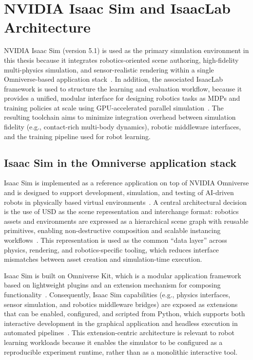 \section{NVIDIA Isaac Sim and IsaacLab Architecture}
\label{sec:isaac_sim_isaaclab_architecture}

NVIDIA Isaac Sim (version 5.1) is used as the primary simulation environment in this thesis because it integrates robotics-oriented scene authoring, high-fidelity multi-physics simulation, and sensor-realistic rendering within a single Omniverse-based application stack~\cite{nvidia_isaac_sim_510_what_is}. In addition, the associated IsaacLab framework is used to structure the learning and evaluation workflow, because it provides a unified, modular interface for designing robotics tasks as \acp{MDP} and training policies at scale using GPU-accelerated parallel simulation~\cite{Mittal2025IsaacLab}. The resulting toolchain aims to minimize integration overhead between simulation fidelity (e.g., contact-rich multi-body dynamics), robotic middleware interfaces, and the training pipeline used for robot learning.

\subsection{Isaac Sim in the Omniverse application stack}
Isaac Sim is implemented as a reference application on top of NVIDIA Omniverse and is designed to support development, simulation, and testing of AI-driven robots in physically based virtual environments~\cite{nvidia_isaac_sim_510_what_is}. A central architectural decision is the use of \ac{USD} as the scene representation and interchange format: robotics assets and environments are expressed as a hierarchical scene graph with reusable primitives, enabling non-destructive composition and scalable instancing workflows~\cite{nvidia_isaac_sim_510_what_is}. This representation is used as the common ``data layer'' across physics, rendering, and robotics-specific tooling, which reduces interface mismatches between asset creation and simulation-time execution.

Isaac Sim is built on Omniverse Kit, which is a modular application framework based on lightweight plugins and an extension mechanism for composing functionality~\cite{nvidia_isaac_sim_510_what_is}. Consequently, Isaac Sim capabilities (e.g., physics interfaces, sensor simulation, and robotics middleware bridges) are exposed as extensions that can be enabled, configured, and scripted from Python, which supports both interactive development in the graphical application and headless execution in automated pipelines~\cite{nvidia_isaac_sim_510_what_is}. This extension-centric architecture is relevant to robot learning workloads because it enables the simulator to be configured as a reproducible experiment runtime, rather than as a monolithic interactive tool.

